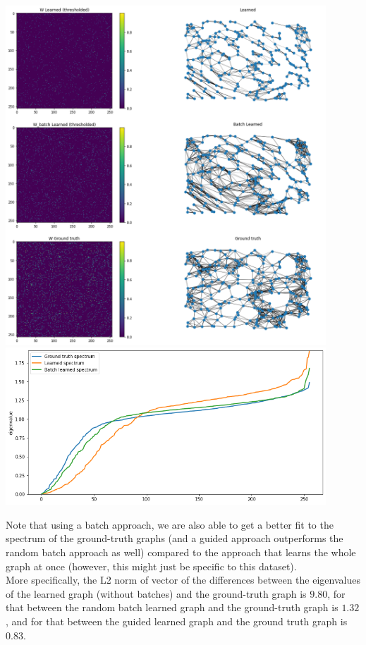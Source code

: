 \documentclass[a4paper]{article}
\newcommand{\nl}{\vspace{0.2cm}\\}
\begin{document}
\begin{enumerate}
\begin{center}
            \includegraphics[width=0.9\textwidth]{images/p3/half_guided_learned_graphs.png}\\
            \includegraphics[width=0.9\textwidth]{images/p3/half_guided_spectrum.png}
        \end{center}
\end{enumerate}

Note that using a batch approach, we are also able to get a better fit to the spectrum of the ground-truth graphs (and a guided approach outperforms the random batch approach as well)
compared to the approach that learns the whole graph at once (however, this might just be specific to this dataset).\nl
More specifically, the L2 norm of vector of the differences between the eigenvalues
of the learned graph (without batches) and the ground-truth graph is $9.80$, for that between the random batch learned graph and the ground-truth graph is $1.32$, and for that between the guided
learned graph and the ground truth graph is $0.83$.
\end{document}
